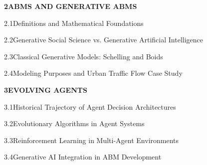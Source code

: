 \documentclass[12pt,a4paper]{report}
\begin{document}
\noindent\textbf{2\quad ABMS AND GENERATIVE ABMS}\dotfill\textbf{\pageref{chap:abms_and_gabms}}\par
\vspace{3pt}
\noindent\hspace{0.3in}2.1\quad Definitions and Mathematical Foundations\dotfill\pageref{sec:math_foundations}\par
\vspace{2pt}
\noindent\hspace{0.3in}2.2\quad Generative Social Science vs. Generative Artificial Intelligence\dotfill\pageref{sec:epistemology}\par
\vspace{2pt}
\noindent\hspace{0.3in}2.3\quad Classical Generative Models: Schelling and Boids\dotfill\pageref{sec:classic_models}\par
\vspace{2pt}
\noindent\hspace{0.3in}2.4\quad Modeling Purposes and Urban Traffic Flow Case Study\dotfill\pageref{sec:traffic_case}\par
\vspace{6pt}

\noindent\textbf{3\quad EVOLVING AGENTS}\dotfill\textbf{\pageref{chap:evolving_agents}}\par
\vspace{3pt}
\noindent\hspace{0.3in}3.1\quad Historical Trajectory of Agent Decision Architectures\dotfill\pageref{sec:history_agents}\par
\vspace{2pt}
\noindent\hspace{0.3in}3.2\quad Evolutionary Algorithms in Agent Systems\dotfill\pageref{sec:eas}\par
\vspace{2pt}
\noindent\hspace{0.3in}3.3\quad Reinforcement Learning in Multi-Agent Environments\dotfill\pageref{sec:rl}\par
\vspace{2pt}
\noindent\hspace{0.3in}3.4\quad Generative AI Integration in ABM Development\dotfill\pageref{sec:genai_roles}\par
\vspace{6pt}
\end{document}
